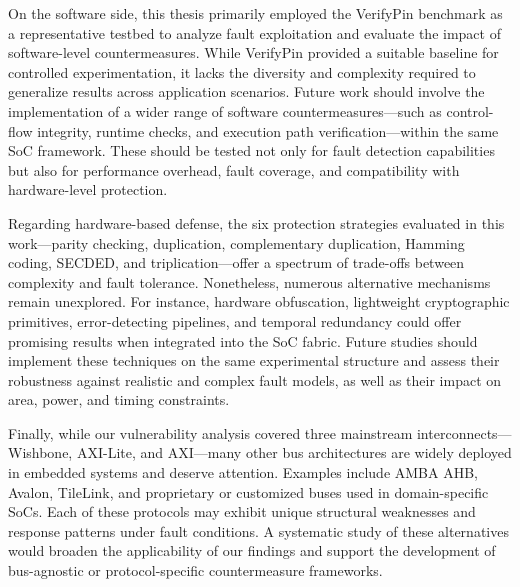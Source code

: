On the software side, this thesis primarily employed the VerifyPin benchmark as a representative testbed to analyze fault exploitation and evaluate the impact of software-level countermeasures. While VerifyPin provided a suitable baseline for controlled experimentation, it lacks the diversity and complexity required to generalize results across application scenarios. Future work should involve the implementation of a wider range of software countermeasures—such as control-flow integrity, runtime checks, and execution path verification—within the same SoC framework. These should be tested not only for fault detection capabilities but also for performance overhead, fault coverage, and compatibility with hardware-level protection.

Regarding hardware-based defense, the six protection strategies evaluated in this work—parity checking, duplication, complementary duplication, Hamming coding, SECDED, and triplication—offer a spectrum of trade-offs between complexity and fault tolerance. Nonetheless, numerous alternative mechanisms remain unexplored. For instance, hardware obfuscation, lightweight cryptographic primitives, error-detecting pipelines, and temporal redundancy could offer promising results when integrated into the SoC fabric. Future studies should implement these techniques on the same experimental structure and assess their robustness against realistic and complex fault models, as well as their impact on area, power, and timing constraints.

Finally, while our vulnerability analysis covered three mainstream interconnects—Wishbone, AXI-Lite, and AXI—many other bus architectures are widely deployed in embedded systems and deserve attention. Examples include AMBA AHB, Avalon, TileLink, and proprietary or customized buses used in domain-specific SoCs. Each of these protocols may exhibit unique structural weaknesses and response patterns under fault conditions. A systematic study of these alternatives would broaden the applicability of our findings and support the development of bus-agnostic or protocol-specific countermeasure frameworks.
